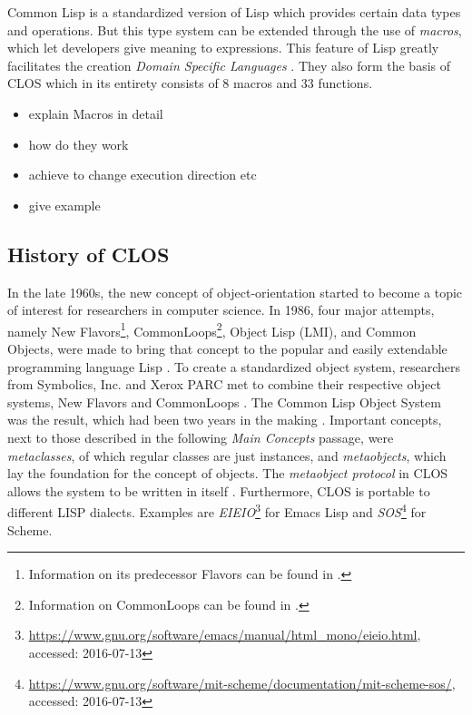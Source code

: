 \documentclass[oribibl]{llncs}
\begin{document}
Common Lisp is a standardized version of Lisp which provides certain data types and operations. But this type system can be extended through the use of \emph{macros}, which let developers give meaning to expressions. This feature of Lisp greatly facilitates the creation \emph{Domain Specific Languages} \cite{fowler2011domain-specific}. They also form the basis of CLOS which in its entirety consists of 8 macros and 33 functions.

\begin{itemize}
\item explain Macros in detail
\item how do they work
\item achieve to change execution direction etc
\item give example
\end{itemize}



\subsection{History of CLOS}
\label{sec:history}

In the late 1960s, the new concept of object-orientation started to become a topic of interest for researchers in computer science. In 1986, four major attempts, namely New Flavors\footnote{Information on its predecessor Flavors can be found in \cite{Moon:1986:OPF:28697.28698}.}, CommonLoops\footnote{Information on CommonLoops can be found in \cite{Bobrow:1986:CML:28697.28700}.}, Object Lisp (LMI), and Common Objects, were made to bring that concept to the popular and easily extendable programming language Lisp \cite{steele1993evolution}. To create a standardized object system, researchers from Symbolics, Inc. and Xerox PARC met to combine their respective object systems, New Flavors and CommonLoops \cite{demichiel1987common}. The Common Lisp Object System was the result, which had been two years in the making \cite{steele1993evolution}. Important concepts, next to those described in the following \emph{Main Concepts} passage, were \emph{metaclasses}, of which regular classes are just instances, and \emph{metaobjects}, which lay the foundation for the concept of objects. \cite{kiczales1991art} The \emph{metaobject protocol} in CLOS allows the system to be written in itself \cite{steele1993evolution}. Furthermore, CLOS is portable to different LISP dialects. Examples are \emph{EIEIO}\footnote{\url{https://www.gnu.org/software/emacs/manual/html_mono/eieio.html}, accessed: 2016-07-13} for Emacs Lisp and \emph{SOS}\footnote{\url{https://www.gnu.org/software/mit-scheme/documentation/mit-scheme-sos/}, accessed: 2016-07-13} for Scheme.
\end{document}
